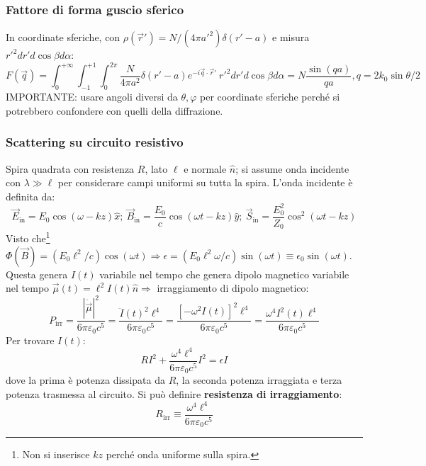 \documentclass[10pt, a4paper]{scrartcl}
\numberwithin{equation}{subsection}
\theoremstyle{style1}
\begin{document}
\subsubsection{Fattore di forma guscio sferico}

In coordinate sferiche, con $\rho (\vec{r}') = N / (4\pi a'^2) \delta(r'-a) $ e misura $r'^2 dr'd\cos \beta d\alpha $:
\begin{equation*}
	F(\vec{q}) = \int_{0} ^{+\infty} \int_{-1} ^{+1} \int_{0} ^{2\pi} \frac{N}{4\pi a^2}\delta (r' -a) e^{-i\vec{q}\cdot \vec{r}'} \ r'^2 dr' d\cos \beta  d\alpha = N \frac{\sin (qa)}{qa}, q = 2k_0 \sin \theta / 2
\end{equation*}
IMPORTANTE: usare angoli diversi da $\theta ,\varphi $ per coordinate sferiche perch\'e si potrebbero confondere con quelli della diffrazione.
\subsubsection{Scattering su circuito resistivo}
Spira quadrata con resistenza $R$, lato $\ell $ e normale $\hat{n}$; si assume onda incidente con $\lambda \gg\ell $ per considerare campi uniformi su tutta la spira. L'onda incidente \`e definita da:
\[
\vec{E}_\text{in} = E_0 \cos(\omega - kz) \hat{x}; \ \vec{B}_\text{in} = \frac{E_0}{c} \cos(\omega t - kz) \hat{y} ; \ \vec{S}_\text{in} = \frac{E_0^2}{Z_0} \cos^2(\omega t- kz)
\] 
Visto che\footnote{Non si inserisce $kz$ perch\'e onda uniforme sulla spira.} $\Phi(\vec{B}) = (E_0 \ell ^2 / c) \cos(\omega t)\Rightarrow \epsilon = (E_0\ell ^2 \omega / c) \sin(\omega t)\equiv \epsilon _0 \sin (\omega t)$. Questa genera $I(t)$ variabile nel tempo che genera dipolo magnetico variabile nel tempo $\vec{\mu }(t) = \ell ^2I(t) \hat{n} \Rightarrow $ irraggiamento di dipolo magnetico:
\begin{equation}
	P_\text{irr}= \frac{|\ddot{\vec{\mu }}|^2}{6 \pi \varepsilon _0 c^5} = \frac{\ddot{I}(t) ^2 \ell ^4}{6\pi \varepsilon _0 c^5} = \frac{\left[ -\omega^2 I(t) \right] ^2\ell ^4}{6\pi\varepsilon _0 c^5} = \frac{\omega^4 I^2(t) \ell ^4}{6\pi \varepsilon _0 c^5}
\end{equation}
Per trovare $I(t)$:
\begin{equation}
	RI^2 + \frac{\omega^4 \ell ^4}{6\pi \varepsilon _0 c^5} I^2 = \epsilon I
\end{equation}
dove la prima \`e potenza dissipata da $R$, la seconda potenza irraggiata e terza potenza trasmessa al circuito. Si pu\`o definire \textbf{resistenza di irraggiamento}:
\begin{equation}
	R_\text{irr} \equiv \frac{\omega^4 \ell ^4}{6\pi \varepsilon _0 c^5}
\end{equation}
\end{document}
